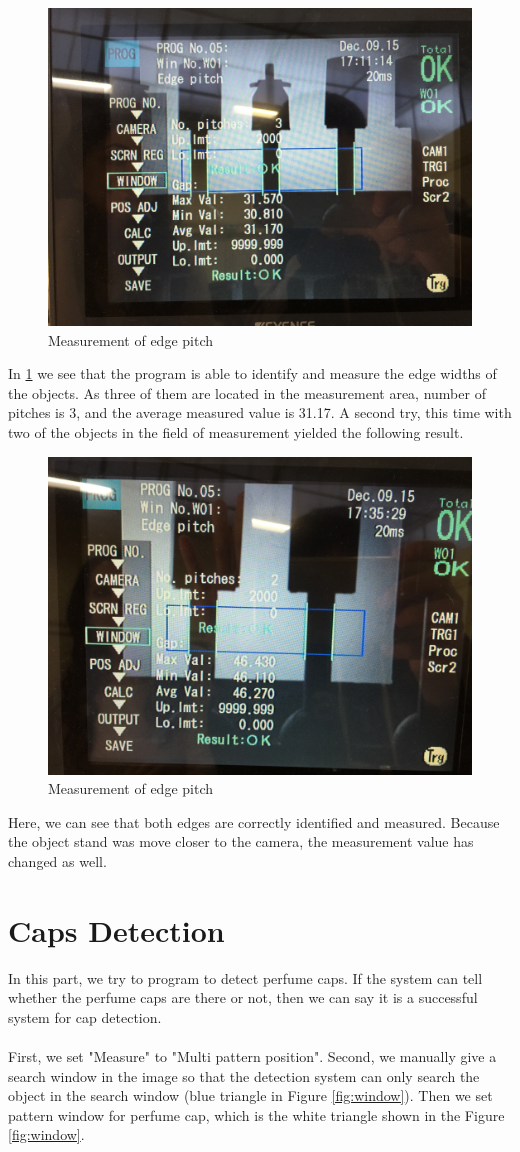 \documentclass[english]{article}
\begin{document}
\begin{figure}[H]
	\centering
	\includegraphics[width=0.6\linewidth]{Pictures/IMG_1222.JPG}
	\caption{Measurement of edge pitch}
	\label{fig:edgepitch}
\end{figure} 
In \ref{fig:edgepitch} we see that the program is able to identify and measure the edge widths of the objects.
As three of them are located in the measurement area, number of pitches is 3, and the average measured value is 31.17.
A second try, this time with two of the objects in the field of measurement yielded the following result.
\begin{figure}[H]
	\centering
	\includegraphics[width=0.6\linewidth]{Pictures/IMG_1224.JPG}
	\caption{Measurement of edge pitch}
	\label{fig:edgepitch2}
\end{figure} 
Here, we can see that both edges are correctly identified and measured.
Because the object stand was move closer to the camera, the measurement value has changed as well.


\section{Caps Detection}
In this part, we try to program to detect perfume caps.
If the system can tell whether the perfume caps are there or not, then we can say it is a successful system for cap detection.\\
\\
First, we set "Measure" to "Multi pattern position".
Second, we manually give a search window in the image so that the detection system can only search the object in the search window (blue triangle in Figure \ref{fig:window}).
Then we set pattern window for perfume cap, which is the white triangle shown in the Figure \ref{fig:window}.
\end{document}
